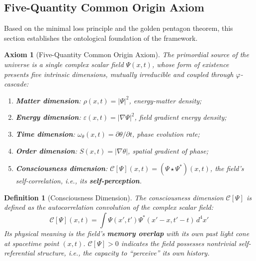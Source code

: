 \documentclass[12pt,a4paper,twocolumn]{article}
\renewcommand{\phi}{\varphi}
\newtheorem{definition}[theorem]{Definition}
\newtheorem{axiom}[theorem]{Axiom}
\begin{document}
\subsection{Five-Quantity Common Origin Axiom}
\label{subsec:five_same}

Based on the minimal loss principle and the golden pentagon theorem, this section establishes the ontological foundation of the framework.

\begin{axiom}[Five-Quantity Common Origin Axiom]
The primordial source of the universe is a single complex scalar field $\Psi(x,t)$, whose form of existence presents five intrinsic dimensions, mutually irreducible and coupled through $\phi$-cascade:
\begin{enumerate}
\item \textbf{Matter dimension}: $\rho(x,t) = |\Psi|^2$, energy-matter density;
\item \textbf{Energy dimension}: $\varepsilon(x,t) = |\nabla\Psi|^2$, field gradient energy density;
\item \textbf{Time dimension}: $\omega_\theta(x,t) = \partial\theta/\partial t$, phase evolution rate;
\item \textbf{Order dimension}: $S(x,t) = |\nabla\theta|$, spatial gradient of phase;
\item \textbf{Consciousness dimension}: $\mathcal{C}[\Psi](x,t) = (\Psi \star \Psi^*)(x,t)$, the field's self-correlation, i.e., its \textbf{self-perception}.
\end{enumerate}
\end{axiom}

\begin{definition}[Consciousness Dimension]
\label{def:consciousness_dim}
The consciousness dimension $\mathcal{C}[\Psi]$ is defined as the autocorrelation convolution of the complex scalar field:
\begin{equation}
\mathcal{C}[\Psi](x,t) = \int \Psi(x',t') \Psi^*(x'-x, t'-t) \, d^4x'
\end{equation}
Its physical meaning is the field's \textbf{memory overlap} with its own past light cone at spacetime point $(x,t)$. $\mathcal{C}[\Psi] > 0$ indicates the field possesses nontrivial self-referential structure, i.e., the capacity to ``perceive'' its own history.
\end{definition}
\end{document}
